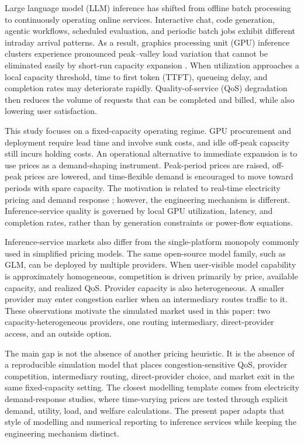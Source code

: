\documentclass[11pt,a4paper]{article}
\begin{document}
Large language model (LLM) inference has shifted from offline batch processing to continuously operating online services. Interactive chat, code generation, agentic workflows, scheduled evaluation, and periodic batch jobs exhibit different intraday arrival patterns. As a result, graphics processing unit (GPU) inference clusters experience pronounced peak--valley load variation that cannot be eliminated easily by short-run capacity expansion \cite{crankshaw2017clipper,gujarati2020clockwork,yu2022orca,kwon2023pagedattention,agrawal2024sarathiserve}. When utilization approaches a local capacity threshold, time to first token (TTFT), queueing delay, and completion rates may deteriorate rapidly. Quality-of-service (QoS) degradation then reduces the volume of requests that can be completed and billed, while also lowering user satisfaction.

This study focuses on a fixed-capacity operating regime. GPU procurement and deployment require lead time and involve sunk costs, and idle off-peak capacity still incurs holding costs. An operational alternative to immediate expansion is to use prices as a demand-shaping instrument. Peak-period prices are raised, off-peak prices are lowered, and time-flexible demand is encouraged to move toward periods with spare capacity. The motivation is related to real-time electricity pricing and demand response \cite{schweppe1988spot,borenstein2005long,albadi2008summary,faruqui2010household,siano2014demand}; however, the engineering mechanism is different. Inference-service quality is governed by local GPU utilization, latency, and completion rates, rather than by generation constraints or power-flow equations.

Inference-service markets also differ from the single-platform monopoly commonly used in simplified pricing models. The same open-source model family, such as GLM, can be deployed by multiple providers. When user-visible model capability is approximately homogeneous, competition is driven primarily by price, available capacity, and realized QoS. Provider capacity is also heterogeneous. A smaller provider may enter congestion earlier when an intermediary routes traffic to it. These observations motivate the simulated market used in this paper: two capacity-heterogeneous providers, one routing intermediary, direct-provider access, and an outside option.

The main gap is not the absence of another pricing heuristic. It is the absence of a reproducible simulation model that places congestion-sensitive QoS, provider competition, intermediary routing, direct-provider choice, and market exit in the same fixed-capacity setting. The closest modelling template comes from electricity demand-response studies, where time-varying prices are tested through explicit demand, utility, load, and welfare calculations. The present paper adapts that style of modelling and numerical reporting to inference services while keeping the engineering mechanism distinct.
\end{document}
